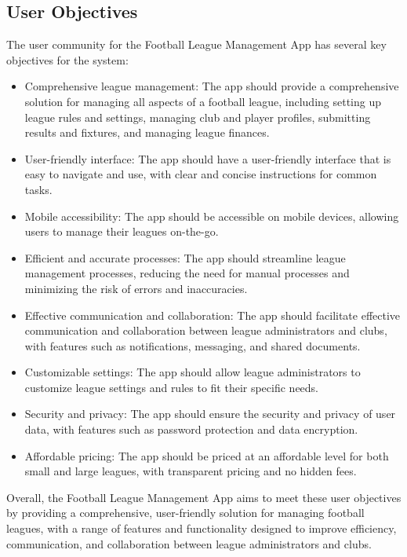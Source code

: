\documentclass[12pt]{article}
\begin{document}
\subsection{ User Objectives}
The user community for the Football League Management App has several key objectives for the system:
\begin{itemize}
    \item Comprehensive league management: The app should provide a comprehensive solution for managing all aspects of a football league, including setting up league rules and settings, managing club and player profiles, submitting results and fixtures, and managing league finances.

    \item User-friendly interface: The app should have a user-friendly interface that is easy to navigate and use, with clear and concise instructions for common tasks.

    \item Mobile accessibility: The app should be accessible on mobile devices, allowing users to manage their leagues on-the-go.

    \item Efficient and accurate processes: The app should streamline league management processes, reducing the need for manual processes and minimizing the risk of errors and inaccuracies.

    \item Effective communication and collaboration: The app should facilitate effective communication and collaboration between league administrators and clubs, with features such as notifications, messaging, and shared documents.

    \item Customizable settings: The app should allow league administrators to customize league settings and rules to fit their specific needs.

    \item Security and privacy: The app should ensure the security and privacy of user data, with features such as password protection and data encryption.

    \item Affordable pricing: The app should be priced at an affordable level for both small and large leagues, with transparent pricing and no hidden fees.
\end{itemize}
Overall, the Football League Management App aims to meet these user objectives by providing a comprehensive, user-friendly solution for managing football leagues, with a range of features and functionality designed to improve efficiency, communication, and collaboration between league administrators and clubs.
\end{document}
